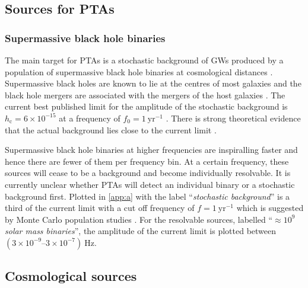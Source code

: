 \subsection{Sources for PTAs}

\subsubsection{Supermassive black hole binaries}

The main target for PTAs is a stochastic background of GWs produced by a population of supermassive black hole binaries at cosmological distances \citep{SesanaVecchioColancino}. Supermassive black holes are known to lie at the centres of most galaxies and the black hole mergers are associated with the mergers of the host galaxies \citep{Volonteri2003,Ferrarese2005}. The current best published limit for the amplitude of the stochastic background is $h_\mathrm{c} = 6\times 10^{-15}$ at a frequency of $f_{0}=1~\mathrm{yr}^{-1}$ \citep{Haasteren}. There is strong theoretical evidence that the actual background lies close to the current limit \citep{Sesana-2012}. 

Supermassive black hole binaries at higher frequencies are inspiralling faster and hence there are fewer of them per frequency bin. At a certain frequency, these sources will cease to be a background and become individually resolvable. It is currently unclear whether PTAs will detect an individual binary or a stochastic background first. Plotted in \ref{app:a} with the label ``\emph{stochastic background}'' is a third of the current limit with a cut off frequency of $f=1~\mathrm{yr}^{-1}$ which is suggested by Monte Carlo population studies \citep{SesanaVecchioColancino}. For the resolvable sources, labelled ``\emph{$\approx 10^{9}$ solar mass binaries}'', the amplitude of the current limit is plotted between $\left(3\times 10^{-9}\right.$--$\left.3\times 10^{-7}\right)~\mathrm{Hz}$.




\subsection{Cosmological sources}

